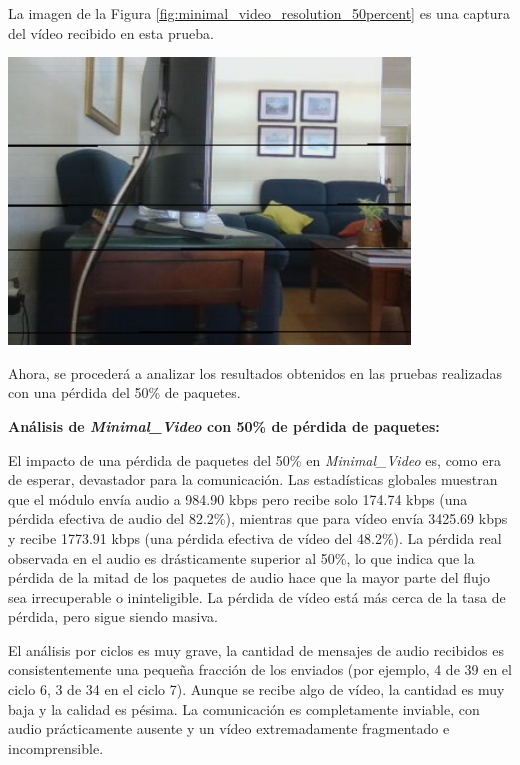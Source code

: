 \newpage

La imagen de la Figura \ref{fig:minimal_video_resolution_50percent} es una captura del vídeo recibido en esta prueba.
\begin{center}
  \includegraphics[width = 0.8\textwidth]{images/VideoRecibido9.3.png}
  \label{fig:minimal_video_resolution_50percent}
\end{center}

\newpage

Ahora, se procederá a analizar los resultados obtenidos en las pruebas realizadas con una pérdida del 50\% de paquetes.
\vspace{\baselineskip}

\textbf{Análisis de \textit{Minimal\_Video} con 50\% de pérdida de paquetes:}
\vspace{\baselineskip}

El impacto de una pérdida de paquetes del 50\% en \textit{Minimal\_Video} es, como era de esperar, devastador para la comunicación. Las estadísticas globales muestran que el módulo envía audio a 984.90 kbps pero recibe solo 174.74 kbps (una pérdida efectiva de audio del 82.2\%), mientras que para vídeo envía 3425.69 kbps y recibe 1773.91 kbps (una pérdida efectiva de vídeo del 48.2\%). La pérdida real observada en el audio es drásticamente superior al 50\%, lo que indica que la pérdida de la mitad de los paquetes de audio hace que la mayor parte del flujo sea irrecuperable o ininteligible. La pérdida de vídeo está más cerca de la tasa de pérdida, pero sigue siendo masiva.
\vspace{\baselineskip}

El análisis por ciclos es muy grave, la cantidad de mensajes de audio recibidos es consistentemente una pequeña fracción de los enviados (por ejemplo, 4 de 39 en el ciclo 6, 3 de 34 en el ciclo 7). Aunque se recibe algo de vídeo, la cantidad es muy baja y la calidad es pésima. La comunicación es completamente inviable, con audio prácticamente ausente y un vídeo extremadamente fragmentado e incomprensible.

